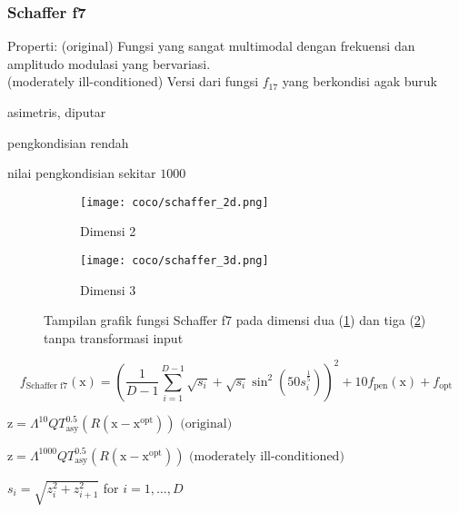 \subsubsection{Schaffer f7}
\noindent Properti:
(original) Fungsi yang sangat multimodal dengan frekuensi dan amplitudo modulasi yang bervariasi.\\
(moderately ill-conditioned) Versi dari fungsi $f_{17}$ yang berkondisi agak buruk
\begin{packed_item}
  \item asimetris, diputar
  \item pengkondisian rendah
  \item nilai pengkondisian sekitar $1000$
\end{packed_item}
\begin{figure}[H]
	\centering
	\begin{subfigure}[b]{0.4\textwidth}
		\centering
		\texttt{[image: coco/schaffer\_2d.png]}
		\caption{Dimensi 2}
		\label{fig:schaffer_2d}
	\end{subfigure}
	\hfill
	\begin{subfigure}[b]{0.4\textwidth}
		\centering
		\texttt{[image: coco/schaffer\_3d.png]}
		\caption{Dimensi 3}
		\label{fig:schaffer_3d}
	\end{subfigure}
	\caption{Tampilan grafik fungsi Schaffer f7 pada dimensi dua (\cref{fig:schaffer_2d}) dan tiga (\cref{fig:schaffer_3d}) tanpa transformasi input}
	\label{fig:schaffer_f7}
\end{figure}
\begin{equation}
  f_{\text{Schaffer f7}}(\mathrm{x})=(\frac{1}{D-1}\sum_{i=1}^{D-1}\sqrt{s_i}+\sqrt{s_i}\sin^2(50s_i^{\frac{1}{5}}))^2+10f_{\text{pen}}(\mathrm{x})+f_{\text{opt}}
\end{equation}
\begin{packed_item}
  \item $\mathrm{z}=\Lambda^{10}QT_{\text{asy}}^{0.5}(R(\mathrm{x}-\mathrm{x}^{\text{opt}}))\text{ (original)}$\\
  \item $\mathrm{z}=\Lambda^{1000}QT_{\text{asy}}^{0.5}(R(\mathrm{x}-\mathrm{x}^{\text{opt}}))\text{ (moderately ill-conditioned)}$\\
  \item $s_i=\sqrt{z_i^2+z_{i+1}^2}$ for $i=1,\ldots,D$
\end{packed_item}

